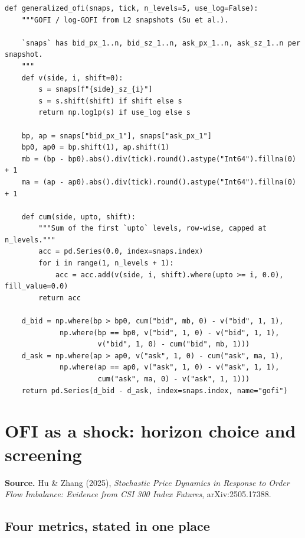 \documentclass[11pt]{article}
\begin{document}
\begin{lstlisting}[caption={Generalised OFI from snapshots, with the optional log transform.}]
def generalized_ofi(snaps, tick, n_levels=5, use_log=False):
    """GOFI / log-GOFI from L2 snapshots (Su et al.).

    `snaps` has bid_px_1..n, bid_sz_1..n, ask_px_1..n, ask_sz_1..n per snapshot.
    """
    def v(side, i, shift=0):
        s = snaps[f"{side}_sz_{i}"]
        s = s.shift(shift) if shift else s
        return np.log1p(s) if use_log else s

    bp, ap = snaps["bid_px_1"], snaps["ask_px_1"]
    bp0, ap0 = bp.shift(1), ap.shift(1)
    mb = (bp - bp0).abs().div(tick).round().astype("Int64").fillna(0) + 1
    ma = (ap - ap0).abs().div(tick).round().astype("Int64").fillna(0) + 1

    def cum(side, upto, shift):
        """Sum of the first `upto` levels, row-wise, capped at n_levels."""
        acc = pd.Series(0.0, index=snaps.index)
        for i in range(1, n_levels + 1):
            acc = acc.add(v(side, i, shift).where(upto >= i, 0.0), fill_value=0.0)
        return acc

    d_bid = np.where(bp > bp0, cum("bid", mb, 0) - v("bid", 1, 1),
             np.where(bp == bp0, v("bid", 1, 0) - v("bid", 1, 1),
                      v("bid", 1, 0) - cum("bid", mb, 1)))
    d_ask = np.where(ap > ap0, v("ask", 1, 0) - cum("ask", ma, 1),
             np.where(ap == ap0, v("ask", 1, 0) - v("ask", 1, 1),
                      cum("ask", ma, 0) - v("ask", 1, 1)))
    return pd.Series(d_bid - d_ask, index=snaps.index, name="gofi")
\end{lstlisting}

\section{OFI as a shock: horizon choice and screening}\label{sec:hu}

\textbf{Source.} Hu \& Zhang (2025), \emph{Stochastic Price Dynamics in Response
to Order Flow Imbalance: Evidence from CSI 300 Index Futures}, arXiv:2505.17388.

\subsection{Four metrics, stated in one place}
\end{document}
